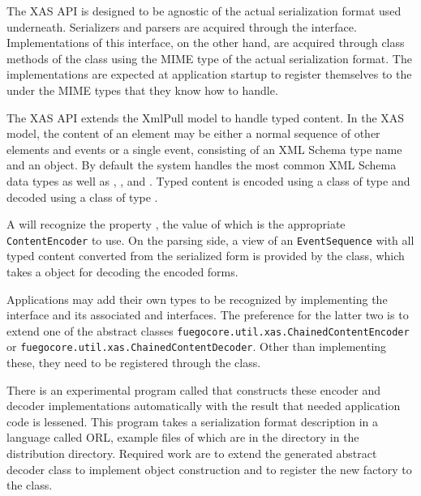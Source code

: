 \documentclass[draft]{article}
\begin{document}
The XAS API is designed to be agnostic of the actual serialization
format used underneath.  Serializers and parsers are acquired through
the  interface.  Implementations
of this interface, on the other hand, are acquired through class
methods of the  class using the
MIME type of the actual serialization format.  The 
implementations are expected at application startup to register
themselves to the  under the MIME types that they
know how to handle.

The XAS API extends the XmlPull model to handle typed content.  In the
XAS model, the content of an element may be either a normal sequence
of other elements and  events or a single
 event, consisting of an XML Schema type name and
an object.  By default the system handles the most common XML Schema
data types as well as ,
, and .  Typed content
is encoded using a class of type
 and decoded using a class of
type .

A  will recognize the property
, the value of
which is the appropriate \texttt{Con\-tent\-Encoder} to use.  On the
parsing side, a view of an \texttt{Event\-Se\-quence} with all typed
content converted from the serialized form is provided by the
 class, which takes a
 object for decoding the encoded forms.

Applications may add their own types to be recognized by implementing
the  interface and its
associated  and  interfaces.
The preference for the latter two is to extend one of the abstract
classes \texttt{fuegocore.util.xas.Chained\-Con\-tent\-En\-cod\-er} or
\texttt{fuegocore.util.xas.ChainedContent\-De\-cod\-er}.  Other than
implementing these, they need to be registered through the
 class.

There is an experimental program called  that constructs
these encoder and decoder implementations automatically with the
result that needed application code is lessened.  This program takes a
serialization format description in a language called \ac{ORL},
example files of which are in the directory
 in the distribution directory.  Required
work are to extend the generated abstract decoder class to implement
object construction and to register the new factory to the
 class.
\end{document}
